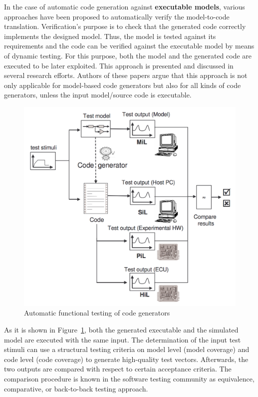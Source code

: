 In the case of automatic code generation against \textbf{executable models}, various approaches have been proposed to automatically verify the model-to-code translation. Verification's purpose is to check that the generated code correctly implements the designed model. Thus, the model is tested against its requirements and the code can be verified against the executable model by means of dynamic testing. For this purpose, both the model and the generated code are executed to be later exploited. This approach is presented and discussed in several research efforts\cite{sturmer2005overview,stuermer2007systematic,conrad2010code,jorges2014back,burnard2004verifying}. Authors of these papers argue that this approach is not only applicable for model-based code generators but also for all kinds of code generators, unless the input model/source code is executable.

\begin{figure}[h]
	\center
	\includegraphics[scale=0.6]{SOTA/fig/testing_process}
	\caption{Automatic functional testing of code generators}
	\label{fig:Process for testing automatically generated code}
\end{figure}

As it is shown in Figure~\ref{fig:Process for testing automatically generated code}, both the generated executable and the simulated model are executed with the same input. 
The determination of the input test stimuli can use a structural testing criteria on model level (model coverage) and code level (code coverage) to generate high-quality test vectors.
Afterwards, the two outputs are compared with respect
to certain acceptance criteria. The comparison procedure is known in the software testing community as equivalence, comparative, or back-to-back testing approach\cite{vouk1990back,mckeeman1998differential}.
 
